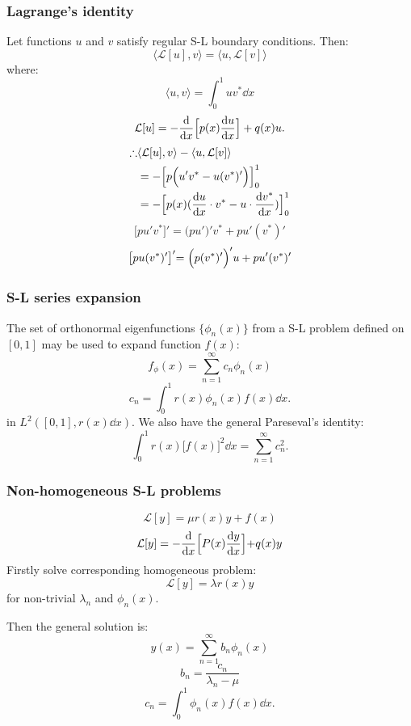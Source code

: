 \documentclass{article}
\begin{document}
\begin{multicols}{3}
\subsubsection*{Lagrange's identity}
Let functions $u$ and $v$ satisfy regular S-L boundary conditions.
Then:
$$\langle \mathcal{L}[u], v \rangle=\langle u, \mathcal{L}[v] \rangle$$
where:
$$\langle u,v \rangle=\int_{0}^{1}uv^* \dd x$$
$$\mathcal{L}[u]=-\dv{x}\Bigl[p(x)\dv{u}{x}\Bigr]+q(x)u.$$
\begin{align*}
    \therefore&\langle \mathcal{L}[u], v \rangle - \langle u, \mathcal{L}[v] \rangle \\
    &=-\Bigl[p\Bigl(u'v^*-u(v^*)'\Bigl)\Bigl]_{0}^{1} \\
    &=-\Bigl[p(x)(\dv{u}{x}\cdot v^*-u\cdot\dv{v^*}{x})\Bigl]_{0}^{1}
\end{align*}
$$\bigl[pu'v^*\bigl]'=\bigl(pu'\bigl)'v^*+pu'(v^*)'$$
$$\bigl[pu(v^*)'\bigl]'=\Bigl(p(v^*)'\Bigl)'u+pu'(v^*)'$$

\subsubsection*{S-L series expansion}
The set of orthonormal eigenfunctions $\{\phi_n(x)\}$
from a S-L problem defined on $[0,1]$
may be used to expand function $f(x)$:
$$f_\phi(x)=\sum_{n=1}^{\infty} c_n\phi_n(x)$$
$$c_n=\int_{0}^{1}r(x)\phi_n(x)f(x)\dd x.$$
in $L^2([0,1], r(x)\dd x)$.
We also have the general Pareseval's identity:
$$\int_{0}^{1}r(x)\bigl[f(x)\bigr]^2\dd x
=\sum_{n=1}^{\infty}c_n^2.$$

\subsubsection*{Non-homogeneous S-L problems}
$$\mathcal{L}[y]=\mu r(x)y+f(x)$$
$$\mathcal{L}[y]=-\dv{x}\Bigl[P(x)\dv{y}{x}\Bigl]+q(x)y$$
Firstly solve corresponding homogeneous problem:
$$\mathcal{L}[y]=\lambda r(x)y$$
for non-trivial $\lambda_n$ and $\phi_n(x)$.

Then the general solution is:
$$y(x)=\sum_{n=1}^{\infty} b_n\phi_n(x)$$
$$b_n=\frac{c_n}{\lambda_n-\mu}$$
$$c_n=\int_{0}^{1}\phi_n(x)f(x)\dd x.$$


\end{multicols}
\end{document}
